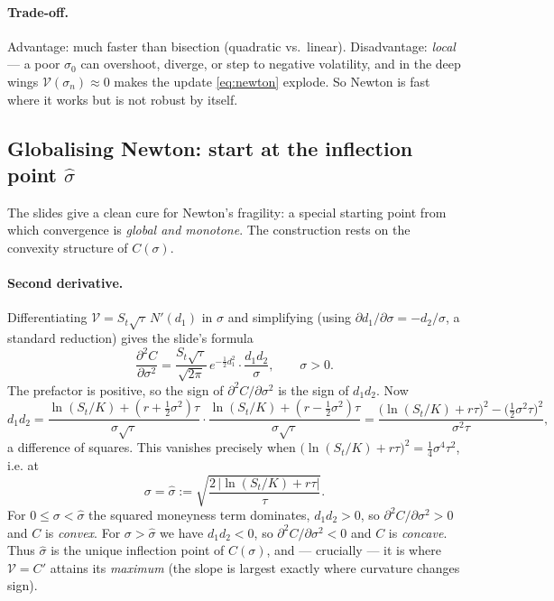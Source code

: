 \documentclass[11pt]{article}
\newcommand{\Vega}{\mathcal{V}}
\begin{document}
\paragraph{Trade-off.} Advantage: much faster than bisection (quadratic vs.\ linear). Disadvantage:
\emph{local} --- a poor $\sigma_0$ can overshoot, diverge, or step to negative volatility, and in
the deep wings $\Vega(\sigma_n)\approx0$ makes the update \eqref{eq:newton} explode. So Newton is
fast where it works but is not robust by itself.

\subsection{Globalising Newton: start at the inflection point $\hat\sigma$}

The slides give a clean cure for Newton's fragility: a special starting point from which
convergence is \emph{global and monotone}. The construction rests on the convexity structure of
$C(\sigma)$.

\paragraph{Second derivative.} Differentiating $\Vega=S_t\sqrt{\tau}\,N'(d_1)$ in $\sigma$ and
simplifying (using $\partial d_1/\partial\sigma=-d_2/\sigma$, a standard reduction) gives the
slide's formula
\begin{equation}\label{eq:d2C}
\frac{\partial^2 C}{\partial\sigma^2}
=\frac{S_t\sqrt{\tau}}{\sqrt{2\pi}}\,e^{-\frac12 d_1^2}\cdot\frac{d_1 d_2}{\sigma},
\qquad\sigma>0.
\end{equation}
The prefactor is positive, so the sign of $\partial^2 C/\partial\sigma^2$ is the sign of $d_1d_2$.
Now
\[
d_1 d_2
=\frac{\ln(S_t/K)+(r+\tfrac12\sigma^2)\tau}{\sigma\sqrt\tau}\cdot
 \frac{\ln(S_t/K)+(r-\tfrac12\sigma^2)\tau}{\sigma\sqrt\tau}
=\frac{\big(\ln(S_t/K)+r\tau\big)^2-\big(\tfrac12\sigma^2\tau\big)^2}{\sigma^2\tau},
\]
a difference of squares. This vanishes precisely when
$\big(\ln(S_t/K)+r\tau\big)^2=\tfrac14\sigma^4\tau^2$, i.e. at
\begin{equation}\label{eq:sigmahat}
\sigma=\hat\sigma:=\sqrt{\frac{2\,\big|\ln(S_t/K)+r\tau\big|}{\tau}}.
\end{equation}
For $0\le\sigma<\hat\sigma$ the squared moneyness term dominates, $d_1d_2>0$, so
$\partial^2 C/\partial\sigma^2>0$ and $C$ is \emph{convex}. For $\sigma>\hat\sigma$ we have
$d_1d_2<0$, so $\partial^2 C/\partial\sigma^2<0$ and $C$ is \emph{concave}. Thus $\hat\sigma$ is
the unique inflection point of $C(\sigma)$, and --- crucially --- it is where $\Vega=C'$ attains
its \emph{maximum} (the slope is largest exactly where curvature changes sign).
\end{document}
